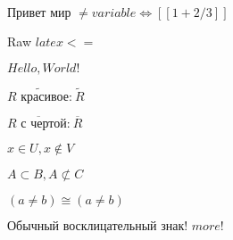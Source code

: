 \documentclass[12pt,a4paper]{scrartcl}
\begin{document}
\(\text{Привет }\allowbreak \text{мир }\allowbreak \neq  variable \Leftrightarrow  [[1 + 2 / 3]]\)

Raw $latex <=$


\(Hello, World!\)

\(\widetilde {R\text{ красивое:}\allowbreak }\ \widetilde R\)

\(\overline {R\text{ с }\allowbreak \text{чертой:}\allowbreak }\ \overline R\)

\(x \in U, x \not\in V\)

\(A \subset B, A \not\subset C\)

\((a \neq  b) \cong  (a \neq  b)\)

\(\text{Обычный }\allowbreak \text{восклицательный }\allowbreak \text{знак! }\allowbreak more!\)
\end{document}
